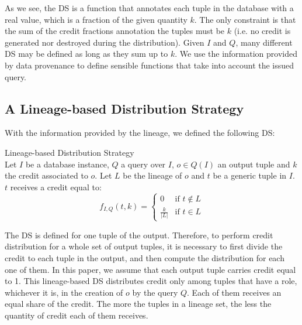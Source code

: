 As we see, the DS is a function that annotates each tuple in the database with a real value, which is a fraction of the given quantity $k$. The only constraint is that the sum of the credit fractions annotation the tuples must be $k$ (i.e. no credit is generated nor destroyed during the distribution).
Given $I$ and $Q$, many different DS may be defined as long as they sum up to $k$. We use the information provided by data provenance to define sensible functions that take into account the issued query. 

\subsection{A Lineage-based Distribution Strategy}
With the information provided by the lineage, we defined the following DS:

\begin{definition}{Lineage-based Distribution Strategy}~\citep{dosso2020data}
    \label{def:lineage_ds}\\
    Let $I$ be a database instance, $Q$ a query over $I$, $o \in Q(I)$ an output tuple and $k$ the credit associated to $o$.
    Let $L$ be the lineage of $o$ and $t$ be a generic tuple in $I$. $t$ receives a credit equal to:
    \begin{equation*}
        f_{I, Q}(t, k) =  \begin{cases}
         0 & \mbox{if $t \notin L$} \\
            \frac{k}{|L|} & \mbox{if $t \in L$}
        \end{cases}
    \end{equation*}
\end{definition}

%

The DS is defined for one tuple of the output. Therefore, to perform credit distribution for a whole set of output tuples, it is necessary to first divide the credit to each tuple in the output, and then compute the distribution for each one of them.
In this paper, we assume that each output tuple carries credit equal to 1. 
This lineage-based DS distributes credit only among tuples that have a role, whichever it is, in the creation of $o$ by the query $Q$. Each of them receives an equal share of the credit. The more the tuples in a lineage set, the less the quantity of credit each of them receives. 


